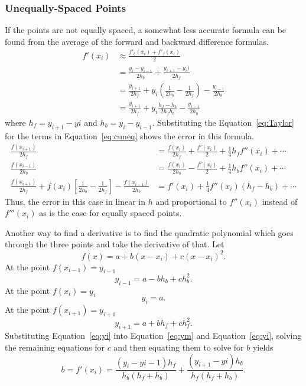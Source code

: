 \documentclass{scrartcl}
\begin{document}
\subsubsection{Unequally-Spaced Points}
If the points are not equally spaced, a somewhat less
accurate formula can be found from the average of the forward
and backward difference formulas.
\begin{align}
f'(x_i) &\approx \frac{f'_b(x_i)+f'_f(x_i)}{2}\\
&= \frac{y_i-y_{i-1}}{2h_b}+\frac{y_{i+1}-y_i)}{2h_f}\\
&= \frac{y_{i+1}}{2h_f}+y_i\left(\frac{1}{2h_b}-\frac{1}{2h_f}\right)
	-\frac{y_{i-1}}{2h_b} \label{eq:cuneq}\\
&= \frac{y_{i+1}}{2h_f}+y_i\frac{h_f-h_b}{2h_f h_b}
	-\frac{y_{i-1}}{2h_b}
\end{align}
where $h_f=y_{i+1}-y{i}$ and $h_b=y_i-y_{i-1}$.
Substituting the Equation~\ref{eq:Taylor} for the terms
in Equation~\ref{eq:cuneq} shows the error in this formula.
\begin{align}
\frac{f(x_{i+1})}{2h_f} &= \frac{f(x_i)}{2h_f}+\frac{f'(x_i)}{2}+
	\frac{1}{4}h_f f''(x_i)+\cdots\\
\frac{f(x_{i-1})}{2h_b} &= \frac{f(x_i)}{2h_b}-\frac{f'(x_i)}{2}+
	\frac{1}{4}h_b f''(x_i)+\cdots\\
\frac{f(x_{i+1})}{2h_f}+f(x_i)\left[\frac{1}{2h_b}-\frac{1}{2h_f}\right]
	-\frac{f(x_{i-1})}{2h_b} &= f'(x_i)+\frac{1}{4}f''(x_i)(h_f-h_b)+\cdots
\end{align}
Thus, the error in this case in linear in $h$ and proportional to
$f''(x_i)$ instead of $f'''(x_i)$ as is the case for equally spaced
points.

Another way to find a derivative is to find the quadratic polynomial
which goes through the three points and take the derivative of that.
Let
\begin{equation}
f(x)=a+b(x-x_i)+c(x-x_i)^2.
\end{equation}
At the point $f(x_{i-1}) = y_{i-1}$
\begin{equation}
y_{i-1} = a-bh_b+ch_b^2.\label{eq:ym}
\end{equation}
At the point $f(x_i)= y_i$
\begin{equation}
y_i = a. \label{eq:yi}
\end{equation}
At the point $f(x_{i+1}) = y_{i+1}$
\begin{equation}
y_{i+1} = a+bh_f+ch_f^2.\label{eq:yp}
\end{equation}
Substituting Equation~\ref{eq:yi} into Equation~\ref{eq:ym}
and Equation~\ref{eq:yi}, solving the remaining equations for $c$
and then equating them to solve for $b$ yields
\begin{equation}
b = f'(x_i) = \frac{(y_i-y{i-1})h_f}{h_b(h_f+h_b)}+
	\frac{(y_{i+1}-y{i})h_b}{h_f(h_f+h_b)}.
\end{equation}
\end{document}
